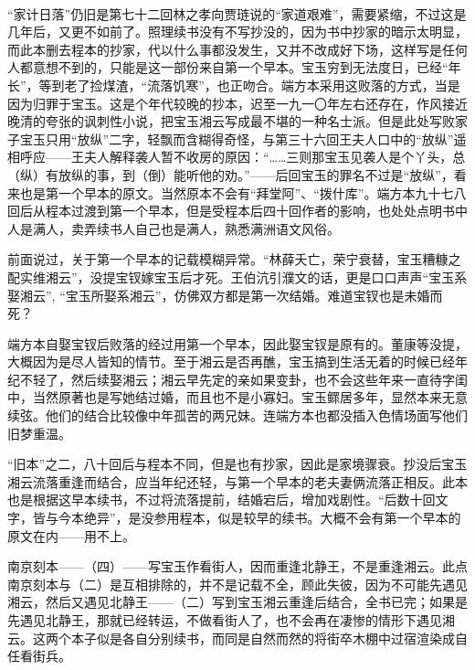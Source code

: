 \par “家计日落”仍旧是第七十二回林之孝向贾琏说的“家道艰难”，需要紧缩，不过这是几年后，又更不如前了。照理续书没有不写抄没的，因为书中抄家的暗示太明显，而此本删去程本的抄家，代以什么事都没发生，又并不改成好下场，这样写是任何人都意想不到的，只能是这一部份来自第一个早本。宝玉穷到无法度日，已经“年长”，等到老了捡煤渣，“流落饥寒”，也正吻合。端方本采用这败落的方式，当是因为归罪于宝玉。这是个年代较晚的抄本，迟至一九一〇年左右还存在，作风接近晚清的夸张的讽刺性小说，把宝玉湘云写成最不堪的一种名士派。但是此处写败家子宝玉只用“放纵”二字，轻飘而含糊得奇怪，与第三十六回王夫人口中的“放纵”遥相呼应——王夫人解释袭人暂不收房的原因：“……三则那宝玉见袭人是个丫头，总（纵）有放纵的事，到（倒）能听他的劝。”——后回宝玉的罪名不过是“放纵”，看来也是第一个早本的原文。当然原本不会有“拜堂阿”、“拨什库”。端方本九十七八回后从程本过渡到第一个早本，但是受程本后四十回作者的影响，也处处点明书中人是满人，卖弄续书人自己也是满人，熟悉满洲语文风俗。
\par 前面说过，关于第一个早本的记载模糊异常。“林薛夭亡，荣宁衰替，宝玉糟糠之配实维湘云”，没提宝钗嫁宝玉后才死。王伯沆引濮文\ZhiXian 的话，更是口口声声“宝玉系娶湘云”, “宝玉所娶系湘云”，仿佛双方都是第一次结婚。难道宝钗也是未婚而死？
\par 端方本自娶宝钗后败落的经过用第一个早本，因此娶宝钗是原有的。董康等没提，大概因为是尽人皆知的情节。至于湘云是否再醮，宝玉搞到生活无着的时候已经年纪不轻了，然后续娶湘云；湘云早先定的亲如果变卦，也不会这些年来一直待字闺中，当然原著也是写她结过婚，而且也不是小寡妇。宝玉鳏居多年，显然本来无意续弦。他们的结合比较像中年孤苦的两兄妹。连端方本也都没插入色情场面写他们旧梦重温。
\par “旧本”之二，八十回后与程本不同，但是也有抄家，因此是家境骤衰。抄没后宝玉湘云流落重逢而结合，应当年纪还轻，与第一个早本的老夫妻俩流落正相反。此本也是根据这早本续书，不过将流落提前，结婚宕后，增加戏剧性。“后数十回文字，皆与今本绝异”，是没参用程本，似是较早的续书。大概不会有第一个早本的原文在内——用不上。
\par 南京刻本——（四）——写宝玉作看街人，因而重逢北静王，不是重逢湘云。此点南京刻本与（二）是互相排除的，并不是记载不全，顾此失彼，因为不可能先遇见湘云，然后又遇见北静王——（二）写到宝玉湘云重逢后结合，全书已完；如果是先遇见北静王，那就已经转运，不做看街人了，也不会再在凄惨的情形下遇见湘云。这两个本子似是各自分别续书，而同是自然而然的将街卒木棚中过宿渲染成自任看街兵。
